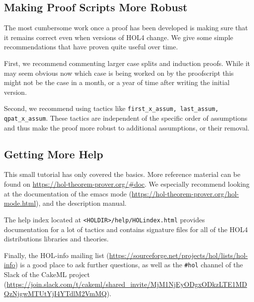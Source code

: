 \subsection{Making Proof Scripts More Robust}
The most cumbersome work once a proof has been developed is making sure that it
remains correct even when versions of HOL4 change.
We give some simple recommendations that have proven quite useful over time.

First, we recommend commenting larger case splits and induction proofs.
While it may seem obvious now which case is being worked on by the proofscript
this might not be the case in a month, or a year of time after writing the
initial version.

Second, we recommend using tactics like
\lstinline{first_x_assum, last_assum, qpat_x_assum}.
These tactics are independent of the specific order of assumptions and thus make
the proof more robust to additional assumptions, or their removal.

\subsection{Getting More Help}
This small tutorial has only covered the basics.
More reference material can be found on \url{https://hol-theorem-prover.org/#doc}.
We especially recommend looking at the documentation of the emacs mode
(\url{https://hol-theorem-prover.org/hol-mode.html}), and the description manual.

The help index located at \lstinline{<HOLDIR>/help/HOLindex.html} provides
documentation for a lot of tactics and contains signature files for all of the
HOL4 distributions libraries and theories.

Finally, the HOL-info mailing list
(\url{https://sourceforge.net/projects/hol/lists/hol-info}) is a good place to
ask further questions, as well as the \texttt{\#hol} channel of the Slack of the
CakeML project (\url{https://join.slack.com/t/cakeml/shared_invite/MjM1NjEyODgxODkzLTE1MDQzNjgwMTUtYjI4YTdlM2VmMQ}).
